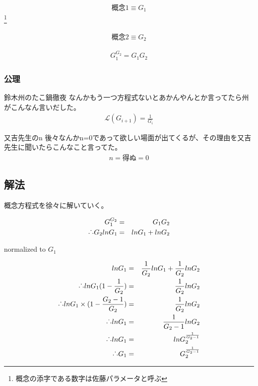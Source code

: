 \documentclass[12pt]{jsarticle}
\begin{document}
\begin{eqnarray}
{概念1}\equiv G_{1}
\end{eqnarray}\footnote{概念の添字である数字は佐藤パラメータと呼ぶ}

\begin{eqnarray}
{概念2}\equiv G_{2}
\end{eqnarray}

\begin{eqnarray}
G_{1}^{G_{2}}=G_{1}G_{2}
\end{eqnarray}

\subsubsection{公理}
\begin{itembox}[c]{鈴木州のたこ鍋徹夜}
なんかもう一つ方程式ないとあかんやんとか言ってたら州がこんなん言いだした。
\begin{eqnarray}
\mathcal{L}(G_{i+1})=\frac{1}{G_{i}}
\end{eqnarray}
\end{itembox}

\begin{itembox}[c]{又吉先生のn}
後々なんかn=0であって欲しい場面が出てくるが、その理由を又吉先生に聞いたらこんなこと言ってた。
\begin{eqnarray}
n = 得ぬ = 0
\end{eqnarray}
\end{itembox}

\newpage
\subsection{解法}
概念方程式を徐々に解いていく。

\begin{eqnarray}
G_{1}^{G_{2}}&=&G_{1}G_{2}\\
\raisebox{.2ex}{.}\raisebox{1.2ex}{.}\raisebox{.2ex}{.}  G_{2}ln{G_{1}}&=&ln{G_{1}}+ln{G_{2}}\\
\end{eqnarray}

normalized to $G_{1}$

\begin{eqnarray}
ln{G_{1}}&=&\frac{1}{G_{2}}ln{G_{1}}+\frac{1}{G_{2}}ln{G_{2}}\\
\raisebox{.2ex}{.}\raisebox{1.2ex}{.}\raisebox{.2ex}{.} ln{G_{1}}(1-\frac{1}{G_{2}})&=&\frac{1}{G_{2}}ln{G_{2}}\\
\raisebox{.2ex}{.}\raisebox{1.2ex}{.}\raisebox{.2ex}{.} ln{G_{1}}\times (1-\frac{G_{2}-1}{G_{2}})&=&\frac{1}{G_{2}}ln{G_{2}}\\
\raisebox{.2ex}{.}\raisebox{1.2ex}{.}\raisebox{.2ex}{.} ln{G_{1}}&=&\frac{1}{G_{2}-1}ln{G_{2}}\\
\raisebox{.2ex}{.}\raisebox{1.2ex}{.}\raisebox{.2ex}{.} ln{G_{1}}&=&ln{G_{2}^{\frac{1}{G_{2}-1}}}\\
\raisebox{.2ex}{.}\raisebox{1.2ex}{.}\raisebox{.2ex}{.} G_{1}&=&G_{2}^{\frac{1}{G_{2}-1}}
 \end{eqnarray}
\end{document}
